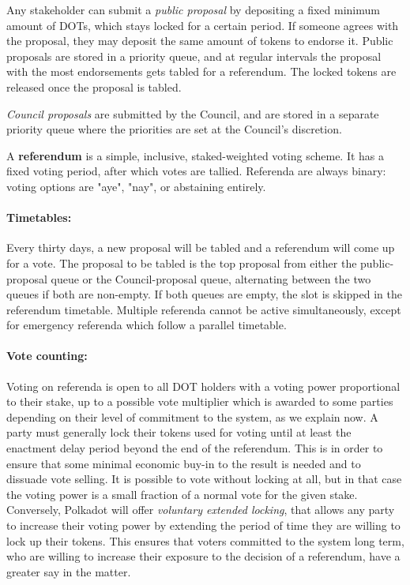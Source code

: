 \documentclass{article}
\begin{document}
Any stakeholder can submit a \emph{public proposal} by depositing a fixed minimum amount of DOTs, which stays locked for a certain period. If someone agrees with the proposal, they may deposit the same amount of tokens to endorse it. Public proposals are stored in a priority queue, and at regular intervals the proposal with the most endorsements gets tabled for a referendum. The locked tokens are released once the proposal is tabled.

\emph{Council proposals} are submitted by the Council, and are stored in a separate priority queue where the priorities are set at the Council's discretion.


A \textbf{referendum} is a simple, inclusive, staked-weighted voting scheme. It has a fixed voting period, after which votes are tallied. Referenda are always binary: voting options are "aye", "nay", or abstaining entirely.

\paragraph{Timetables:} Every thirty days, a new proposal will be tabled and a referendum will come up for a vote. The proposal to be tabled is the top proposal from either the public-proposal queue or the Council-proposal queue, alternating between the two queues if both are non-empty. If both queues are empty, the slot is skipped in the referendum timetable. Multiple referenda cannot be active simultaneously, except for emergency referenda which follow a parallel timetable.

\paragraph{Vote counting:} Voting on referenda is open to all DOT holders with a voting power proportional to their stake, up to a possible vote multiplier which is awarded to some parties depending on their level of commitment to the system, as we explain now. A party must generally lock their tokens used for voting until at least the enactment delay period beyond the end of the referendum. This is in order to ensure that some minimal economic buy-in to the result is needed and to dissuade vote selling. It is possible to vote without locking at all, but in that case the voting power is a small fraction of a normal vote for the given stake. Conversely, Polkadot will offer \emph{voluntary extended locking}, that allows any party to increase their voting power by extending the period of time they are willing to lock up their tokens. This ensures that voters committed to the system long term, who are willing to increase their exposure to the decision of a referendum, have a greater say in the matter. 
\end{document}
